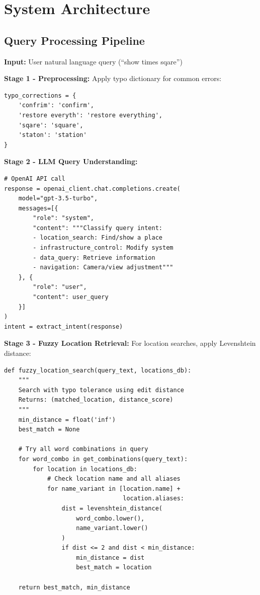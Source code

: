 \documentclass[sigconf]{acmart}
\begin{document}
\section{System Architecture}

\subsection{Query Processing Pipeline}

\textbf{Input:} User natural language query (``show times sqare'')

\textbf{Stage 1 - Preprocessing:} Apply typo dictionary for common errors:
\begin{verbatim}
typo_corrections = {
    'confrim': 'confirm',
    'restore everyth': 'restore everything',
    'sqare': 'square',
    'staton': 'station'
}
\end{verbatim}

\textbf{Stage 2 - LLM Query Understanding:}
\begin{verbatim}
# OpenAI API call
response = openai_client.chat.completions.create(
    model="gpt-3.5-turbo",
    messages=[{
        "role": "system",
        "content": """Classify query intent:
        - location_search: Find/show a place
        - infrastructure_control: Modify system
        - data_query: Retrieve information
        - navigation: Camera/view adjustment"""
    }, {
        "role": "user",
        "content": user_query
    }]
)
intent = extract_intent(response)
\end{verbatim}

\textbf{Stage 3 - Fuzzy Location Retrieval:} For location searches, apply Levenshtein distance:
\begin{verbatim}
def fuzzy_location_search(query_text, locations_db):
    """
    Search with typo tolerance using edit distance
    Returns: (matched_location, distance_score)
    """
    min_distance = float('inf')
    best_match = None

    # Try all word combinations in query
    for word_combo in get_combinations(query_text):
        for location in locations_db:
            # Check location name and all aliases
            for name_variant in [location.name] +
                                 location.aliases:
                dist = levenshtein_distance(
                    word_combo.lower(),
                    name_variant.lower()
                )
                if dist <= 2 and dist < min_distance:
                    min_distance = dist
                    best_match = location

    return best_match, min_distance
\end{verbatim}
\end{document}

